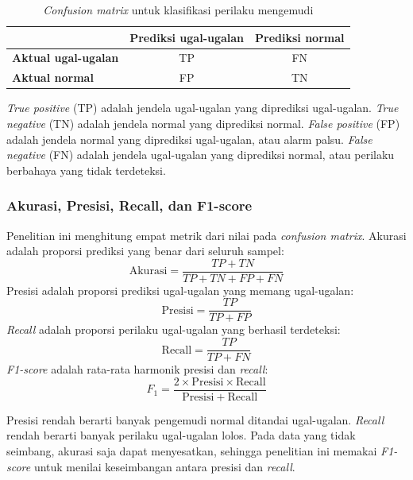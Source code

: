 \begin{table}[H]
  \centering
  \caption{\textit{Confusion matrix} untuk klasifikasi perilaku mengemudi}
  \label{tab:confusion}
  \begin{tabular}{|l|c|c|}
    \hline
     & \textbf{Prediksi ugal-ugalan} & \textbf{Prediksi normal} \\
    \hline
    \textbf{Aktual ugal-ugalan} & TP & FN \\
    \hline
    \textbf{Aktual normal} & FP & TN \\
    \hline
  \end{tabular}
\end{table}

\textit{True positive} (TP) adalah jendela ugal-ugalan yang diprediksi ugal-ugalan. \textit{True negative} (TN) adalah jendela normal yang diprediksi normal. \textit{False positive} (FP) adalah jendela normal yang diprediksi ugal-ugalan, atau alarm palsu. \textit{False negative} (FN) adalah jendela ugal-ugalan yang diprediksi normal, atau perilaku berbahaya yang tidak terdeteksi.

\subsubsection{Akurasi, Presisi, Recall, dan F1-score}
Penelitian ini menghitung empat metrik dari nilai pada \textit{confusion matrix}. Akurasi adalah proporsi prediksi yang benar dari seluruh sampel:
\begin{equation}
  \mathrm{Akurasi} = \frac{TP + TN}{TP + TN + FP + FN}
  \label{eq:akurasi}
\end{equation}
Presisi adalah proporsi prediksi ugal-ugalan yang memang ugal-ugalan:
\begin{equation}
  \mathrm{Presisi} = \frac{TP}{TP + FP}
  \label{eq:presisi}
\end{equation}
\textit{Recall} adalah proporsi perilaku ugal-ugalan yang berhasil terdeteksi:
\begin{equation}
  \mathrm{Recall} = \frac{TP}{TP + FN}
  \label{eq:recall}
\end{equation}
\textit{F1-score} adalah rata-rata harmonik presisi dan \textit{recall}:
\begin{equation}
  F_{1} = \frac{2 \times \mathrm{Presisi} \times \mathrm{Recall}}{\mathrm{Presisi} + \mathrm{Recall}}
  \label{eq:f1}
\end{equation}

Presisi rendah berarti banyak pengemudi normal ditandai ugal-ugalan. \textit{Recall} rendah berarti banyak perilaku ugal-ugalan lolos. Pada data yang tidak seimbang, akurasi saja dapat menyesatkan, sehingga penelitian ini memakai \textit{F1-score} untuk menilai keseimbangan antara presisi dan \textit{recall}.

